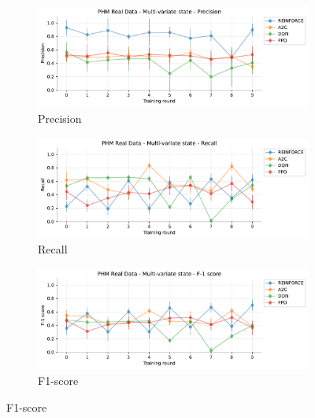 \documentclass[a4paper, 12pt]{article}
\begin{document}
\begin{figure}[!htbp]
	\begin{subfigure}{\textwidth}
		\centering
		\includegraphics[width=\linewidth]{Multivariate_Pr.pdf}  
		\caption{Precision}
		\label{fig:tr-ms-pr}
	\end{subfigure} \par\smallskip
	
	\begin{subfigure}{\textwidth}
		\centering
		\includegraphics[width=\linewidth]{Multivariate_Rc.pdf}  
		\caption{Recall}
		\label{fig:tr-ms-rc}
	\end{subfigure} \par\smallskip
	
	\begin{subfigure}{\textwidth}
		\centering
		\includegraphics[width=\linewidth]{Multivariate_F1.pdf}  
		\caption{F1-score}
		\label{fig:tr-ms-f1}
	\end{subfigure} \par\smallskip
	

\end{figure}
\end{document}

